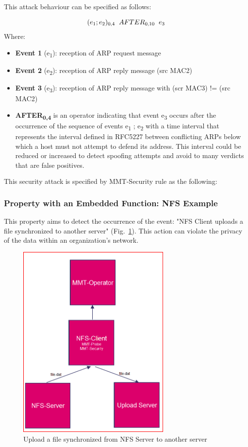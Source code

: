 This attack behaviour can be specified as follows:

\begin{displaymath} 
 (e\textsubscript{1} ; e\textsubscript{2})\textsubscript{0,4}\hspace{2 mm} AFTER \textsubscript{0,10}\hspace{2 mm} e\textsubscript{3}
\end{displaymath}
Where:


\begin{itemize}
\item \textbf{Event 1} (e\textsubscript{1}): reception of ARP request message
\item \textbf{Event 2} (e\textsubscript{2}): reception of ARP reply message (src MAC2)
\item \textbf{Event 3} (e\textsubscript{3}): reception of ARP reply message with (scr MAC3) != (src MAC2)
\item \textbf{AFTER\textsubscript{0,4}} is an operator indicating that event e\textsubscript{3} occurs after the occurrence of the sequence of events e\textsubscript{1} ; e\textsubscript{2} with a time interval that represents the interval defined in RFC5227 between conflicting ARPs below which a host must not attempt to defend its address. This interval could be reduced or increased to detect spoofing attempts and avoid to many verdicts that are false positives.
\end{itemize}

\bigskip

This security attack is specified by MMT-Security rule as the following:


\subsubsection{Property with an Embedded Function: NFS Example}
This property aims to detect the occurrence of the event: "NFS Client uploads a file synchronized to another server" (Fig.~\ref{nfs_upload}). This action can violate the privacy of the data within an organization\rq s network. 
\begin{figure}[H]
\centering
\includegraphics[width=3in]{img/nfs.PNG}
\caption{Upload a file synchronized from NFS Server to another server}
\label{nfs_upload}
\end{figure}

